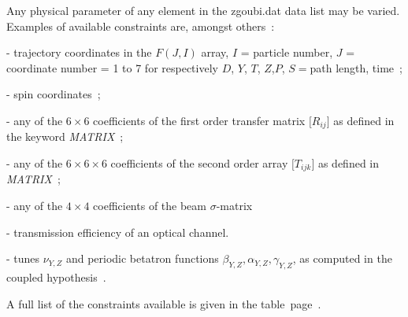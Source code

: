 \medskip 
\noindent Any physical parameter of any element in the zgoubi.dat data list may 
be varied. Examples of available constraints  are, amongst others~:  

\noindent -  trajectory coordinates in the  $ F(J,I) $ array, 
$ I $  =  particle number, $ J $  = coordinate number = 1 to 7 for 
respectively $ D$, $Y$, $T$, $Z$,$ P $, $ S= $path length, time~;

\noindent -  spin coordinates~;

\noindent - any of the $6 \times 6$
coefficients of the first order transfer matrix $ \lbrack R_{ij}\rbrack $ as defined in the
keyword \textsl{MATRIX}~; 


\noindent - any of the
$6\times 6 \times6 $ coefficients of the second order array $ \lbrack T_{ijk}\rbrack $ 
as defined in \textsl{MATRIX}~; 

\noindent - any of the $ 4 \times 4 $ coefficients of the beam \mbox{$\sigma$-matrix} 

\noindent - transmission efficiency of an optical channel. 

\noindent - tunes $\nu_{Y,Z}$ and  periodic betatron functions $\beta_{Y,Z}, \alpha_{Y,Z}, \gamma_{Y,Z}$,  
 as computed in the coupled hypothesis~\cite{Coupling}. 


\medskip

\noindent A full list of the constraints available is given in the table~page~\pageref{TabFITZlst1}. 

